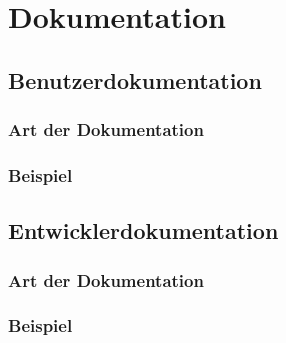 \section{Dokumentation}
\subsection{Benutzerdokumentation}
\subsubsection{Art der Dokumentation}
\subsubsection{Beispiel}
\subsection{Entwicklerdokumentation}
\subsubsection{Art der Dokumentation}
\subsubsection{Beispiel}
